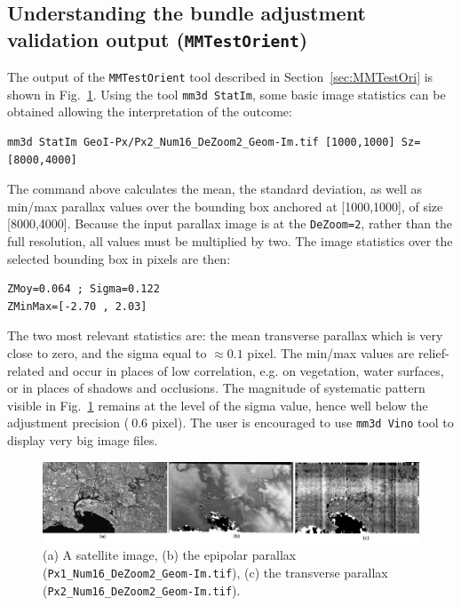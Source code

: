 \subsection{Understanding the bundle adjustment validation output ({\tt MMTestOrient})}
% 
The output of the {\tt MMTestOrient} tool described in Section~\ref{sec:MMTestOri} is shown in Fig.~\ref{fig:satMMTestOri}. Using the tool {\tt mm3d StatIm}, some basic image statistics can be obtained allowing the interpretation of the outcome:
\begin{verbatim}
mm3d StatIm GeoI-Px/Px2_Num16_DeZoom2_Geom-Im.tif [1000,1000] Sz=[8000,4000]
\end{verbatim}
%
The command above calculates the mean, the standard deviation, as well as min/max parallax values over the bounding box anchored at [1000,1000], of size [8000,4000]. Because the input parallax image is at the \texttt{DeZoom=2}, rather than the full resolution, all values must be multiplied by two. The image statistics over the selected bounding box in pixels are then:
\begin{verbatim}
ZMoy=0.064 ; Sigma=0.122
ZMinMax=[-2.70 , 2.03]
\end{verbatim}
%   
The two most relevant statistics are: the mean transverse parallax which is very close to zero, and the sigma equal to $\approx 0.1$ pixel. The min/max values are relief-related and occur in places of low correlation, e.g. on vegetation, water surfaces, or in places of shadows and occlusions. The magnitude of systematic pattern visible in Fig.~\ref{fig:satMMTestOri} remains at the level of the sigma value, hence well below the adjustment precision ($~0.6$ pixel). The user is encouraged to use \texttt{mm3d Vino} tool to display very big image files.
%
\begin{figure}[h!]
\centering
\includegraphics[width=0.95\linewidth]{FIGS/Satellites/IMG_Px1_Px2_Num16.png}
\caption{(a) A satellite image, (b) the epipolar parallax (\texttt{Px1\_Num16\_DeZoom2\_Geom-Im.tif}), (c) the transverse parallax (\texttt{Px2\_Num16\_DeZoom2\_Geom-Im.tif}).}
\label{fig:satMMTestOri}
\end{figure}

